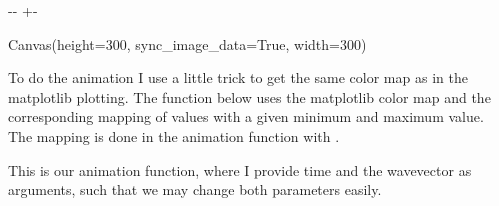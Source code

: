 \documentclass[letterpaper,10pt,english]{sphinxmanual}
\newlength\nbsphinxcodecellspacing
\begin{document}
{

\kern-\sphinxverbatimsmallskipamount\kern-\baselineskip
\kern+\FrameHeightAdjust\kern-\fboxrule
\vspace{\nbsphinxcodecellspacing}

\begin{sphinxVerbatim}[commandchars=\\\{\}]
Canvas(height=300, sync\_image\_data=True, width=300)
\end{sphinxVerbatim}
}

To do the animation I use a little trick to get the same color map as in the matplotlib plotting. The function below uses the matplotlib color map  and the corresponding mapping of values with a given minimum  and maximum  value. The mapping is done in the animation function with .

{
\begin{sphinxVerbatim}[commandchars=\\\{\}]
\llap{\color{nbsphinxin}[10]:\,\hspace{\fboxrule}\hspace{\fboxsep}}
   

  

   
\end{sphinxVerbatim}
}

This is our animation function, where I provide time and the wavevector as arguments, such that we may change both parameters easily.
\end{document}

